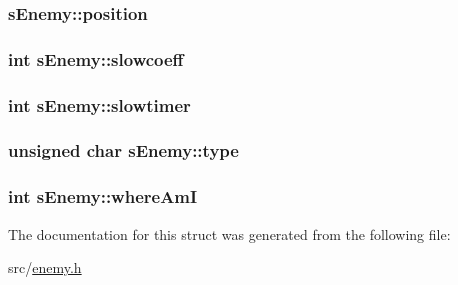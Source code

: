\subsubsection[{position}]{ s\+Enemy\+::position}\label{structs_enemy_a470b9c7b6aba2b0abe9a7421c07a3441}
\hypertarget{structs_enemy_a201f8e838aa8f1c91c35fd6c92d5acf3}{}
\subsubsection[{slowcoeff}]{\setlength{\rightskip}{0pt plus 5cm}int s\+Enemy\+::slowcoeff}\label{structs_enemy_a201f8e838aa8f1c91c35fd6c92d5acf3}
\hypertarget{structs_enemy_a288d3987c9819d3a37f33d3649a8f8f2}{}
\subsubsection[{slowtimer}]{\setlength{\rightskip}{0pt plus 5cm}int s\+Enemy\+::slowtimer}\label{structs_enemy_a288d3987c9819d3a37f33d3649a8f8f2}
\hypertarget{structs_enemy_a489802fdb01def60e2cca9b238887d02}{}
\subsubsection[{type}]{\setlength{\rightskip}{0pt plus 5cm}unsigned char s\+Enemy\+::type}\label{structs_enemy_a489802fdb01def60e2cca9b238887d02}
\hypertarget{structs_enemy_aff7c9c05f34dce9562407d02737b6b57}{}
\subsubsection[{where\+Am\+I}]{\setlength{\rightskip}{0pt plus 5cm}int s\+Enemy\+::where\+Am\+I}\label{structs_enemy_aff7c9c05f34dce9562407d02737b6b57}


The documentation for this struct was generated from the following file\+:\begin{DoxyCompactItemize}
\item 
src/\hyperlink{enemy_8h}{enemy.\+h}\end{DoxyCompactItemize}
